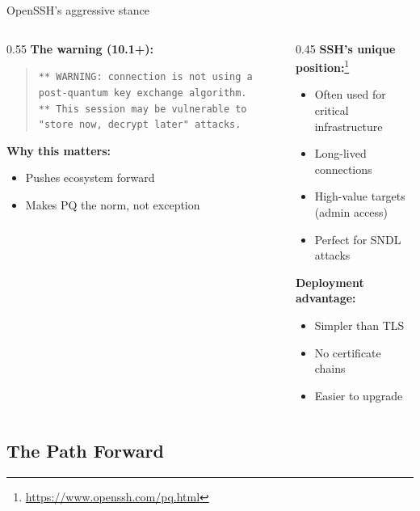 \documentclass[aspectratio=169, lualatex]{beamer} %
\begin{document}
\begin{frame}{OpenSSH's aggressive stance}
	\begin{columns}[c]
		\begin{column}{0.55\textwidth}
			\textbf{The warning (10.1+):}
			\begin{quote}
				\small
				\texttt{** WARNING: connection is not using a post-quantum key exchange algorithm.\\
					** This session may be vulnerable to "store now, decrypt later" attacks.}
			\end{quote}

			\textbf{Why this matters:}
			\begin{itemize}
				\item Pushes ecosystem forward
				\item Makes PQ the norm, not exception
			\end{itemize}
		\end{column}
		\begin{column}{0.45\textwidth}
			\textbf{SSH's unique position:}\footnote{\url{https://www.openssh.com/pq.html}}
			\begin{itemize}
				\item Often used for critical infrastructure
				\item Long-lived connections
				\item High-value targets (admin access)
				\item Perfect for SNDL attacks
			\end{itemize}

			\textbf{Deployment advantage:}
			\begin{itemize}
				\item Simpler than TLS
				\item No certificate chains
				\item Easier to upgrade
			\end{itemize}
		\end{column}
	\end{columns}
\end{frame}

\subsection{The Path Forward}
\end{document}
